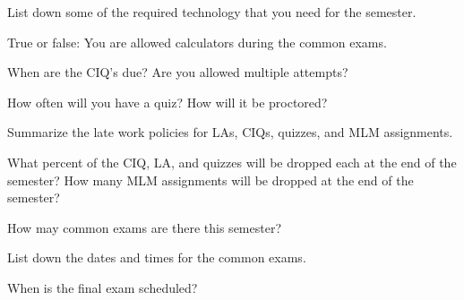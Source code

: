 \documentclass{exam}
\numberwithin{equation}{section} %
\numberwithin{figure}{section} %
\numberwithin{table}{section} %
\begin{document}
\begin{questions}
\question List down some of the required technology that you need for the semester.
\begin{solution}[\stretch{2}]

\end{solution}

\question True or false: You are allowed calculators during the common exams.
\begin{solution}[\stretch{1}]

\end{solution}

\question When are the CIQ's due? Are you allowed multiple attempts?%
\begin{solution}[\stretch{1}]

\end{solution}

\question How often will you have a quiz? How will it be proctored?
\begin{solution}[\stretch{1}]

\end{solution}

\newpage

\question Summarize the late work policies for LAs, CIQs, quizzes, and MLM assignments.
\begin{solution}[\stretch{2}]

\end{solution}

\question What percent of the CIQ, LA, and quizzes will be dropped each at the end of the semester? How many MLM assignments will be dropped at the end of the semester?
\begin{solution}[\stretch{1}]

\end{solution}


\question How may common exams are there this semester?
\begin{solution}[\stretch{1}]

\end{solution}

\question List down the dates and times for the common exams. 
\begin{solution}[\stretch{2}]

\end{solution}

\question When is the final exam scheduled?
\begin{solution}[\stretch{1}]

\end{solution}


\end{questions}
\end{document}
